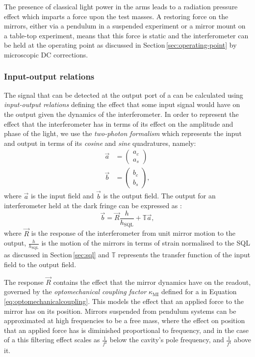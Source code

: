 The presence of classical light power in the arms leads to a radiation pressure effect which imparts a force upon the test masses. A restoring force on the mirrors, either via a pendulum in a suspended experiment or a mirror mount on a table-top experiment, means that this force is static and the interferometer can be held at the operating point as discussed in Section\,\ref{sec:operating-point} by microscopic \gls{DC} corrections.

\subsubsection{Input-output relations}
The signal that can be detected at the output port of a \FPMI{} can be calculated using \emph{input-output relations} defining the effect that some input signal would have on the output given the dynamics of the interferometer. In order to represent the effect that the interferometer has in terms of its effect on the amplitude and phase of the light, we use the \emph{two-photon formalism} \cite{Caves1985, Schumaker1985} which represents the input and output in terms of its \emph{cosine} and \emph{sine} quadratures, namely:
\begin{align}
  \vec{a} &=
  \begin{pmatrix}
    a_c \\
    a_s
  \end{pmatrix} \\
  \vec{b} &=
  \begin{pmatrix}
    b_c \\
    b_s
  \end{pmatrix},
\end{align}
where $\vec{a}$ is the input field and $\vec{b}$ is the output field. The output for an interferometer held at the dark fringe can be expressed as \cite{Danilishin2015}:
\begin{equation}
  \label{eq:ifo-output-signal}
  \vec{b} = \vec{R} \frac{h}{h_{\text{SQL}}} + \mathbb{T} \vec{a},
\end{equation}
where $\vec{R}$ is the response of the interferometer from unit mirror motion to the output, $\frac{h}{h_{\text{SQL}}}$ is the motion of the mirrors in terms of strain normalised to the \gls{SQL} as discussed in Section\,\ref{sec:sql} and $\mathbb{T}$ represents the transfer function of the input field to the output field.

The response $\vec{R}$ contains the effect that the mirror dynamics have on the readout, governed by the \emph{optomechanical coupling factor} $\kappa_{\text{MI}}$ defined for a \MI{} in Equation\,\ref{eq:optomechanicalcoupling}. This models the effect that an applied force to the mirror has on its position. Mirrors suspended from pendulum systems can be approximated at high frequencies to be a free mass, where the effect on position that an applied force has is diminished proportional to frequency, and in the case of a \FPMI{} this filtering effect scales as $\frac{1}{f^2}$ below the cavity's pole frequency, and $\frac{1}{f^4}$ above it.

